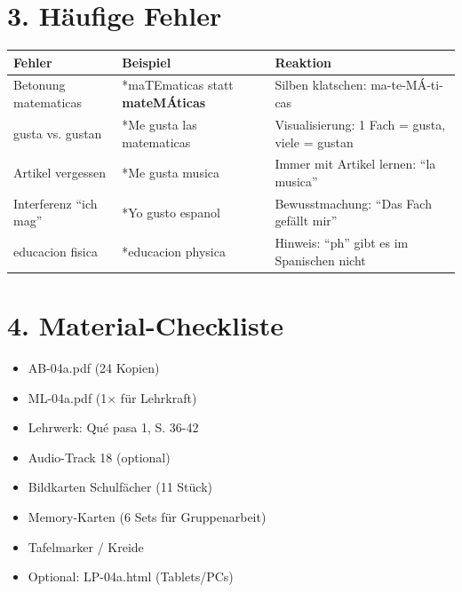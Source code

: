 \documentclass[11pt, a4paper]{article}
\newcommand{\fachfarbe}{spanisch}
\newcommand{\sequenz}{04}
\newcommand{\block}{a}
\newcommand{\lerngruppengroesse}{24}
\newcommand{\es}[1]{\textcolor{\fachfarbe}{\textbf{#1}}}
\begin{document}

\section*{3. Häufige Fehler}

\begin{fehlerbox}
\begin{tabularx}{\textwidth}{|l|X|X|}
\hline
\textbf{Fehler} & \textbf{Beispiel} & \textbf{Reaktion} \\
\hline
Betonung matematicas & *maTEmaticas statt \es{mateMÁticas} & Silben klatschen: ma-te-MÁ-ti-cas \\
\hline
gusta vs. gustan & *Me gusta las matematicas & Visualisierung: 1 Fach = gusta, viele = gustan \\
\hline
Artikel vergessen & *Me gusta musica & Immer mit Artikel lernen: ``la musica'' \\
\hline
Interferenz ``ich mag'' & *Yo gusto espanol & Bewusstmachung: ``Das Fach gefällt mir'' \\
\hline
educacion fisica & *educacion physica & Hinweis: ``ph'' gibt es im Spanischen nicht \\
\hline
\end{tabularx}
\end{fehlerbox}


\section*{4. Material-Checkliste}

\begin{materialbox}
\begin{itemize}[label=$\square$]
    \item AB-\sequenz\block.pdf (\lerngruppengroesse{} Kopien)
    \item ML-\sequenz\block.pdf (1$\times$ für Lehrkraft)
    \item Lehrwerk: Qué pasa 1, S. 36-42
    \item Audio-Track 18 (optional)
    \item Bildkarten Schulfächer (11 Stück)
    \item Memory-Karten (6 Sets für Gruppenarbeit)
    \item Tafelmarker / Kreide
    \item Optional: LP-\sequenz\block.html (Tablets/PCs)
\end{itemize}
\end{materialbox}
\end{document}
